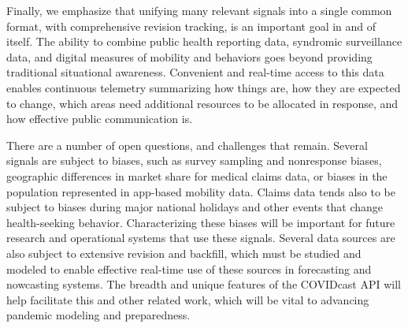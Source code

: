 \documentclass[9pt,twocolumn,twoside,lineno]{pnas-new}
\begin{document}
Finally, we emphasize that unifying many relevant signals into a single common
format, with comprehensive revision tracking, is an important goal in and of
itself. The ability to combine public health reporting data, syndromic
surveillance data, and digital measures of mobility and behaviors goes beyond
providing traditional situational awareness.  Convenient and real-time access to
this data enables continuous telemetry summarizing how things are, how they are
expected to change, which areas need additional resources to be allocated in
response, and how effective public communication is.

There are a number of open questions, and challenges that remain. Several
signals are subject to biases, such as survey sampling and nonresponse biases,
geographic differences in market share for medical claims data, or biases in the
population represented in app-based mobility data.
Claims data tends also to be subject to biases during major national holidays
and other events that change health-seeking behavior. Characterizing these
biases will be important for future research and operational systems that use
these signals.  Several data sources are also subject to extensive revision and
backfill, which must be studied and modeled to enable effective real-time use of
these sources in forecasting and nowcasting systems. The breadth and unique
features of the COVIDcast API will help facilitate this and other related work,
which will be vital to advancing pandemic modeling and preparedness.


\showacknow{} %


\end{document}
